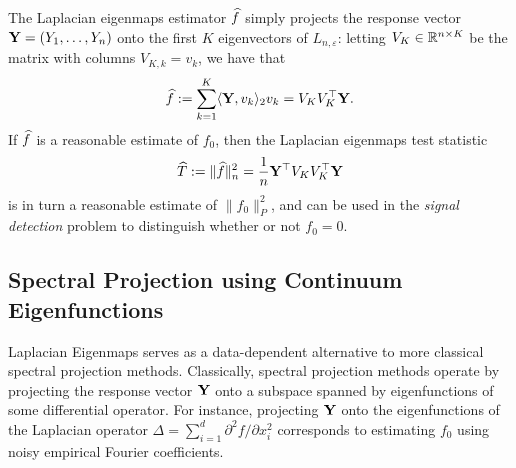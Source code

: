 The Laplacian eigenmaps estimator $\widehat{f}$ simply projects the response vector ${\bf Y} = (Y_1,\ldots,Y_n)$ onto the first $K$ eigenvectors of $L_{n,\varepsilon}$: letting $V_K \in \mathbb{R}^{n \times K}$ be the matrix with columns $V_{K,k} = v_k$, we have that
\begin{equation}
\label{eqn:laplacian_eigenmaps_estimator}
\widehat{f} := \sum_{k = 1}^{K} \langle {\bf Y}, v_k \rangle_{2} v_k = V_K V_K^{\top} {\bf Y}.
\end{equation} 
If $\widehat{f}$ is a reasonable estimate of $f_0$, then the Laplacian eigenmaps test statistic
\begin{equation}
\label{eqn:laplacian_eigenmaps_test}
\widehat{T} := \|\widehat{f}\|_n^2 = \frac{1}{n} {\bf Y}^{\top} V_K V_K^{\top} {\bf Y}
\end{equation}
is in turn a reasonable estimate of $\|f_0\|_{P}^2$, and can be used in the \emph{signal detection} problem to distinguish whether or not $f_0 = 0$.


\subsection{Spectral Projection using Continuum Eigenfunctions}
\label{subsec:spectral_projection}
Laplacian Eigenmaps serves as a data-dependent alternative to more classical spectral projection methods. Classically, spectral projection methods operate by projecting the response vector ${\bf Y}$ onto a subspace spanned by eigenfunctions of some differential operator. For instance, projecting ${\bf Y}$ onto the eigenfunctions of the Laplacian operator $\Delta = \sum_{i = 1}^{d} \partial^2f/\partial x_i^2$ corresponds to estimating $f_0$ using noisy empirical Fourier coefficients.

